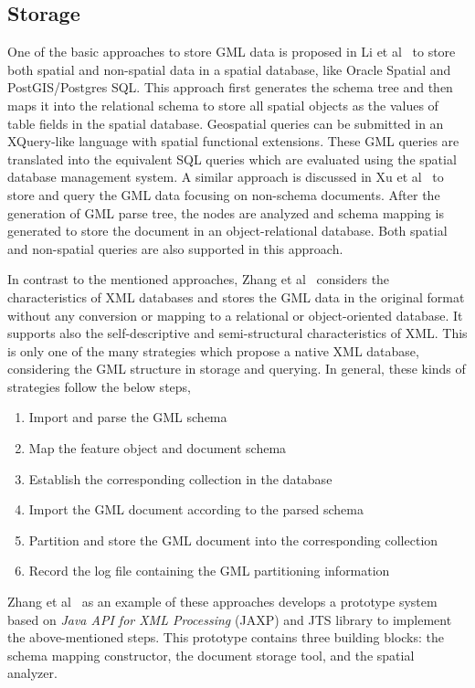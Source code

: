 \documentclass[a4paper,12pt]{article}
\begin{document}
\subsection{Storage}
\label{storage}
One of the basic approaches to store GML data is proposed in Li et al~\cite{Li2004} to store both spatial and non-spatial data in a spatial database, like Oracle Spatial and PostGIS/Postgres SQL. This approach first generates the schema tree and then maps it into the relational schema to store all spatial objects as the values of table fields in the spatial database. Geospatial queries can be submitted 
in an XQuery-like language with spatial functional extensions. These GML queries are translated into the equivalent SQL queries which are evaluated using the spatial database management system. 
A similar approach is discussed in Xu et al~\cite{Zhu2011} to store and query the GML data focusing on non-schema documents. After the generation of GML parse tree, the nodes are analyzed and schema mapping is generated to store the document in an object-relational database. 
Both spatial and non-spatial queries are also supported in this approach.

In contrast to the mentioned approaches, Zhang et al~\cite{Zhang2008} considers the characteristics of XML databases and stores the GML data in the original format without any conversion or mapping to a relational or object-oriented database. 
It supports also the self-descriptive and semi-structural characteristics of XML.
This is only one of the many strategies which propose a native XML database, considering the GML structure in storage and querying. 
In general, these kinds of strategies follow the below steps,
\begin{enumerate}
\item Import and parse the GML schema
\item Map the feature object and document schema
\item Establish the corresponding collection in the database
\item Import the GML document according to the parsed schema
\item Partition and store the GML document into the corresponding collection
\item Record the log file containing the GML partitioning information
\end{enumerate}
Zhang et al~\cite{Zhang2008} as an example of these approaches develops a prototype system based on \textit{Java API for XML Processing} (JAXP) and JTS library to implement the above-mentioned steps. 
This prototype contains three building blocks: the schema mapping constructor, the document storage tool, 
and the spatial analyzer.
\end{document}
